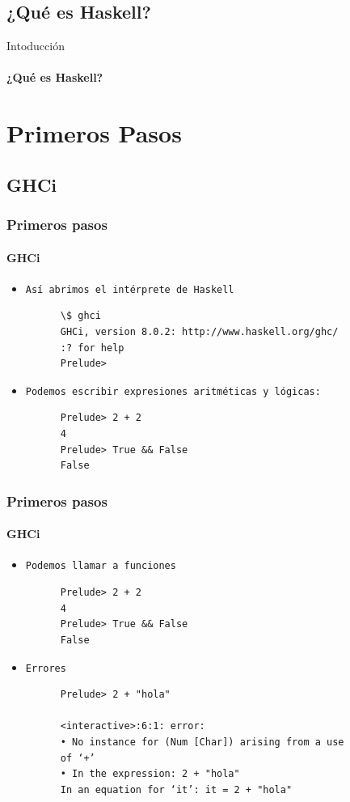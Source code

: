 \documentclass{beamer}
\begin{document}
\subsection{¿Qué es Haskell?}
\begin{frame}{Intoducción}      %
  \framesubtitle{¿Qué es Haskell?}

\end{frame}

\section{Primeros Pasos}
\subsection{GHCi}
\begin{frame}[fragile]
  \frametitle{Primeros pasos}
  \framesubtitle{GHCi}
  \begin{itemize}
  \item\texttt{Así abrimos el intérprete de Haskell}
    \begin{verbatim}
      \$ ghci
      GHCi, version 8.0.2: http://www.haskell.org/ghc/
      :? for help
      Prelude>
    \end{verbatim}

  \item\texttt{Podemos escribir expresiones aritméticas y lógicas:}
    \begin{verbatim}
      Prelude> 2 + 2
      4
      Prelude> True && False
      False
    \end{verbatim}
  \end{itemize}
\end{frame}

\begin{frame}[fragile]
  \frametitle{Primeros pasos}
  \framesubtitle{GHCi}
  \begin{itemize}
  \item\texttt{Podemos llamar a funciones}
    \begin{verbatim}
      Prelude> 2 + 2
      4
      Prelude> True && False
      False
    \end{verbatim}

  \item\texttt{Errores}
    \begin{verbatim}
      Prelude> 2 + "hola"

      <interactive>:6:1: error:
      • No instance for (Num [Char]) arising from a use
      of ‘+’
      • In the expression: 2 + "hola"
      In an equation for ‘it’: it = 2 + "hola"
    \end{verbatim}
  \end{itemize}
\end{frame}
\end{document}
